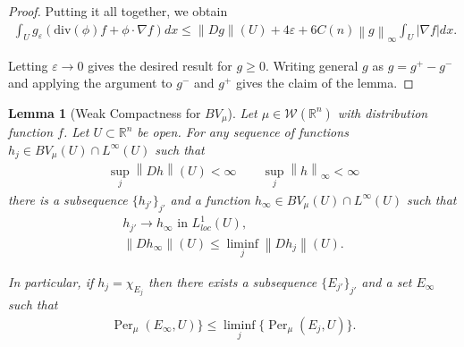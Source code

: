 \documentclass[12pt]{amsart}
\numberwithin{equation}{section}
\theoremstyle{plain}
\newtheorem{lemma}[theorem]{Lemma}
\theoremstyle{definition}
\newcommand{\norm}[1]{\left\lVert#1\right\rVert}
\begin{document}
\begin{proof}
Putting it all together, we obtain
\begin{align*}
    \int_{U} g_{\varepsilon}(\text{div}(\phi)f + \phi \cdot \nabla f)dx \le \norm{Dg}(U) + 4\varepsilon+ 6C(n)\norm{g}_{\infty}\int_{U}|\nabla f|dx.
\end{align*}

Letting $\varepsilon \rightarrow 0$ gives the desired result for $g \ge 0$.  Writing general $g$ as $g = g^+ - g^-$ and applying the argument to $g^-$ and $g^+$ gives the claim of the lemma.
\end{proof}


\begin{lemma}[Weak Compactness for $BV_{\mu}$]\label{l:weak compactness}
    Let $\mu \in \mathscr{W}(\mathbb{R}^n)$ with distribution function $f$. Let $U \subset \mathbb{R}^n$ be open. For any sequence of functions $h_j \in BV_{\mu}(U) \cap L^{\infty}(U)$ such that 
    \begin{align*}
        \sup_j \norm{Dh}(U) <\infty \qquad \sup_j \norm{h}_{\infty}<\infty
    \end{align*}
there is a subsequence $\{h_{j'}\}_{j'}$ and a function $h_{\infty} \in BV_{\mu}(U) \cap L^{\infty}(U)$ such that   
\begin{align*}
    h_{j'} \rightarrow h_{\infty} \text{  in  } L^1_{loc}(U),\\
    \norm{Dh_{\infty}}(U) \le \liminf_j \norm{Dh_j}(U).
\end{align*} 

In particular, if $h_j = \chi_{E_j}$  then there exists a subsequence $\{E_{j'}\}_{j'}$ and a set $E_{\infty}$ such that 
    \begin{align*}
\operatorname{Per}_{\mu}(E_{\infty}, U)\} \le \liminf_j \{\operatorname{Per}_{\mu}(E_j, U)\}.
    \end{align*}
\end{lemma}
\end{document}
